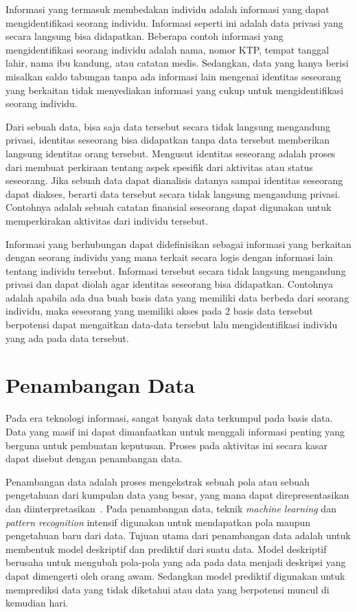 Informasi yang termasuk membedakan individu adalah informasi yang dapat mengidentifikasi seorang individu. Informasi seperti ini adalah data privasi yang secara langsung bisa didapatkan. Beberapa contoh informasi yang mengidentifikasi seorang individu adalah nama, nomor KTP, tempat tanggal lahir, nama ibu kandung, atau catatan medis. Sedangkan, data yang hanya berisi misalkan saldo tabungan tanpa ada informasi lain mengenai identitas seseorang yang berkaitan tidak menyediakan informasi yang cukup untuk mengidentifikasi seorang individu.

Dari sebuah data, bisa saja data tersebut secara tidak langsung mengandung privasi, identitas seseorang bisa didapatkan tanpa data tersebut memberikan langsung identitas orang tersebut. Mengusut identitas seseorang adalah proses dari membuat perkiraan tentang aspek spesifik dari aktivitas atau status seseorang. Jika sebuah data dapat dianalisis datanya sampai identitas seseorang dapat diakses, berarti data tersebut secara tidak langsung mengandung privasi. Contohnya adalah sebuah catatan finansial seseorang dapat digunakan untuk memperkirakan aktivitas dari individu tersebut.

Informasi yang berhubungan dapat didefinisikan sebagai informasi yang berkaitan dengan seorang individu yang mana terkait secara logis dengan informasi lain tentang individu tersebut. Informasi tersebut secara tidak langsung mengandung privasi dan dapat diolah agar identitas seseorang bisa didapatkan. Contohnya adalah apabila ada dua buah basis data yang memiliki data berbeda dari seorang individu, maka seseorang yang memiliki akses pada 2 basis data tersebut berpotensi dapat mengaitkan data-data tersebut lalu mengidentifikasi individu yang ada pada data tersebut.

\section{Penambangan Data}
\label{sec:penambangandata}

Pada era teknologi informasi, sangat banyak data terkumpul pada basis data. Data yang masif ini dapat dimanfaatkan untuk menggali informasi penting yang berguna untuk pembuatan keputusan. Proses pada aktivitas ini secara kasar dapat disebut dengan penambangan data.

Penambangan data adalah proses mengekstrak sebuah pola atau sebuah pengetahuan dari kumpulan data yang besar, yang mana dapat direpresentasikan dan diinterpretasikan~\cite{mendes:17:ppdmieee}. Pada penambangan data, teknik \textit{machine learning} dan \textit{pattern recognition} intensif digunakan untuk mendapatkan pola maupun pengetahuan baru dari data. Tujuan utama dari penambangan data adalah untuk membentuk model deskriptif dan prediktif dari suatu data. Model deskriptif berusaha untuk mengubah pola-pola yang ada pada data menjadi deskripsi yang dapat dimengerti oleh orang awam. Sedangkan model prediktif digunakan untuk memprediksi data yang tidak diketahui atau data yang berpotensi muncul di kemudian hari.


